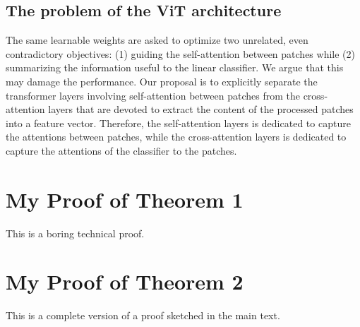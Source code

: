 \documentclass[anon,12pt]{colt2024} %
\begin{document}
\subsection{The problem of the ViT architecture}
The same learnable weights are asked to optimize two unrelated, even contradictory objectives: (1) guiding the self-attention between patches while (2) summarizing the information useful to the linear classifier.
We argue that this may damage the performance.
Our proposal is to explicitly separate the transformer layers involving self-attention between patches from the cross-attention layers that are devoted to extract the content of the processed patches into a feature vector.
Therefore, the self-attention layers is dedicated to capture the attentions between patches, while the cross-attention layers is dedicated to capture the attentions of the classifier to the patches.




\appendix


\section{My Proof of Theorem 1}

This is a boring technical proof.

\section{My Proof of Theorem 2}

This is a complete version of a proof sketched in the main text.
\end{document}
